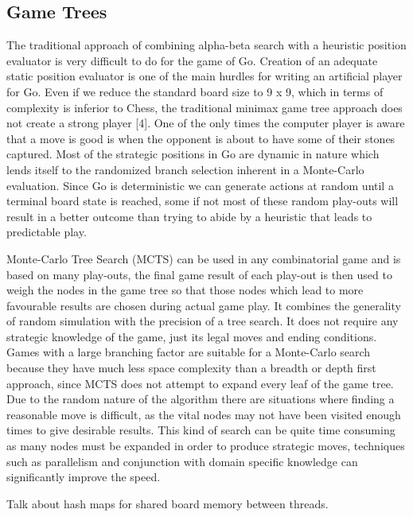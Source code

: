 \documentclass[conference]{IEEEtran}
\begin{document}
\subsection{Game Trees}
The traditional approach of combining alpha-beta search with a heuristic position evaluator is very difficult to do for the game of Go. Creation of an adequate static position evaluator is one of the main hurdles for writing an artificial player for Go. Even if we reduce the standard board size to 9 x 9, which in terms of complexity is inferior to Chess, the traditional minimax game tree approach does not create a strong player [4]. One of the only times the computer player is aware that a move is good is when the opponent is about to have some of their stones captured. Most of the strategic positions in Go are dynamic in nature which lends itself to the randomized branch selection inherent in a Monte-Carlo evaluation. Since Go is deterministic we can generate actions at random until a terminal board state is reached, some if not most of these random play-outs will result in a better outcome than trying to abide by a heuristic that leads to predictable play.\par
Monte-Carlo Tree Search (MCTS) can be used in any combinatorial game and is based on many play-outs, the final game result of each play-out is then used to weigh the nodes in the game tree so that those nodes which lead to more favourable results are chosen during actual game play. It combines the generality of random simulation with the precision of a tree search. It does not require any strategic knowledge of the game, just its legal moves and ending conditions. Games with a large branching factor are suitable for a Monte-Carlo search because they have much less space complexity than a breadth or depth first approach, since MCTS does not attempt to expand every leaf of the game tree. Due to the random nature of the algorithm there are situations where finding a reasonable move is difficult, as the vital nodes may not have been visited enough times to give desirable results. This kind of search can be quite time consuming as many nodes must be expanded in order to produce strategic moves, techniques such as parallelism and conjunction with domain specific knowledge can significantly improve the speed.\par
Talk about hash maps for shared board memory between threads.
\end{document}
